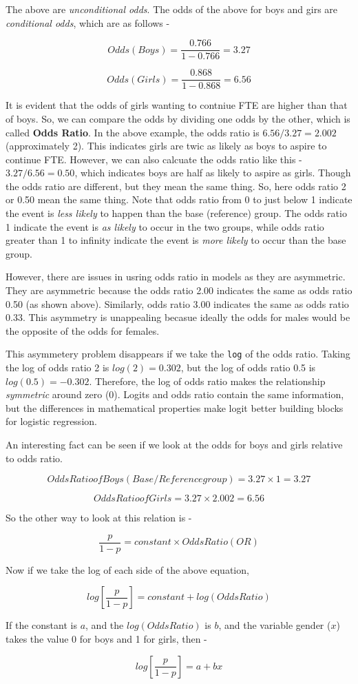 \documentclass[
  letterpaper,
  DIV=11,
  numbers=noendperiod]{scrreprt}
\begin{document}
\begin{tcolorbox}
The above are \emph{unconditional odds}. The odds of the above for boys
and girs are \emph{conditional odds}, which are as follows -

\[
Odds (Boys) = \frac{0.766}{1-0.766} = 3.27
\]

\[
Odds (Girls) = \frac{0.868}{1-0.868} = 6.56
\]

It is evident that the odds of girls wanting to contniue FTE are higher
than that of boys. So, we can compare the odds by dividing one odds by
the other, which is called \textbf{Odds Ratio}. In the above example,
the odds ratio is \(6.56/3.27 = 2.002\) (approximately 2). This
indicates girls are twic as likely as boys to aspire to continue FTE.
However, we can also calcuate the odds ratio like this -
\(3.27/6.56 = 0.50\), which indicates boys are half as likely to aspire
as girls. Though the odds ratio are different, but they mean the same
thing. So, here odds ratio 2 or 0.50 mean the same thing. Note that odds
ratio from 0 to just below 1 indicate the event is \emph{less likely} to
happen than the base (reference) group. The odds ratio 1 indicate the
event is \emph{as likely} to occur in the two groups, while odds ratio
greater than 1 to infinity indicate the event is \emph{more likely} to
occur than the base group.

However, there are issues in usring odds ratio in models as they are
asymmetric. They are asymmetric because the odds ratio 2.00 indicates
the same as odds ratio 0.50 (as shown above). Similarly, odds ratio 3.00
indicates the same as odds ratio 0.33. This asymmetry is unappealing
becasue ideally the odds for males would be the opposite of the odds for
females.

This asymmetery problem disappears if we take the \texttt{log} of the
odds ratio\footnotemark{}. Taking the log of odds ratio 2 is
\(log(2) = 0.302\), but the log of odds ratio 0.5 is
\(log(0.5) = -0.302\). Therefore, the log of odds ratio makes the
relationship \emph{symmetric} around zero (0). Logits and odds ratio
contain the same information, but the differences in mathematical
properties make logit better building blocks for logistic regression.

An interesting fact can be seen if we look at the odds for boys and
girls relative to odds ratio.

\[
Odds Ratio of Boys (Base/Reference group) = 3.27 \times 1 = 3.27
\]

\[
Odds Ratio of Girls = 3.27 \times 2.002 = 6.56
\]

So the other way to look at this relation is -

\[
\frac{p}{1-p} = constant \times Odds Ratio (OR)
\]

Now if we take the log of each side of the above equation,

\[
log[\frac{p}{1-p}] = constant + log (Odds Ratio)
\]

If the constant is \(a\), and the \(log (Odds Ratio)\) is \(b\), and the
variable gender (\(x\)) takes the value 0 for boys and 1 for girls, then
-

\[
log[\frac{p}{1-p}] = a + bx
\]

\end{tcolorbox}
\end{document}
